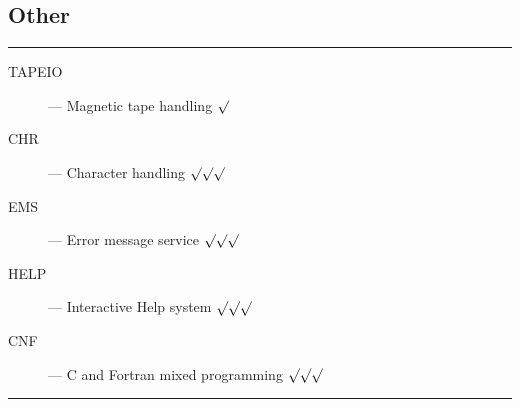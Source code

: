 \newpage

\subsection{Other}

\rule{\textwidth}{0.5mm}
\begin{description}
\begin{description}
\item [TAPEIO] --- Magnetic tape handling \hfill $\surd$
\item [CHR] --- Character handling \hfill $\surd\surd\surd$
\item [EMS] --- Error message service \hfill $\surd\surd\surd$
\item [HELP] --- Interactive Help system \hfill $\surd\surd\surd$
\item [CNF] --- C and Fortran mixed programming \hfill $\surd\surd\surd$
\end{description}
\end{description}
\rule{\textwidth}{0.5mm}

